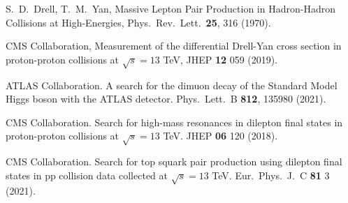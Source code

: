 \documentclass[a4paper,10pt,english]{article}
\begin{document}
\vspace{-0.5cm}
\begin{thebibliography}{References}
S.\ D.\ Drell, T.\ M.\ Yan, Massive Lepton Pair Production in Hadron-Hadron Collisions at High-Energies,
Phys.\ Rev.\ Lett.\ \textbf{25}, 316 (1970).

CMS Collaboration, Measurement of the differential Drell-Yan cross section in proton-proton collisions
at $\sqrt{s}=13$ TeV, JHEP \textbf{12} 059 (2019).

ATLAS Collaboration. A search for the dimuon decay of the Standard Model Higgs boson with the ATLAS detector.
Phys.\ Lett.\ B \textbf{812}, 135980 (2021).

CMS Collaboration. Search for high-mass resonances in dilepton final states in proton-proton collisions
at $\sqrt{s}=13$ TeV. JHEP \textbf{06} 120 (2018).

CMS Collaboration. Search for top squark pair production using dilepton final states in pp collision data
collected at $\sqrt{s}=13$ TeV. Eur.\ Phys.\ J.\ C \textbf{81} 3 (2021).
\end{thebibliography}
\end{document}
